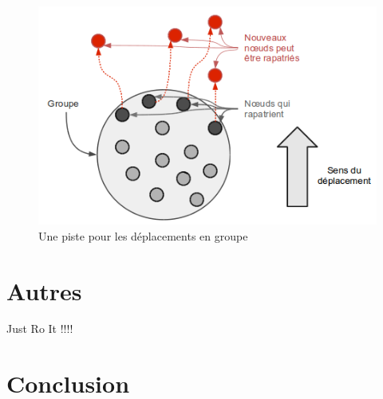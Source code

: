 \documentclass[11pt,a4paper]{article}
\begin{document}
	\vspace{1cm}
        \begin{figure}[!h]
        \centering
        \includegraphics[scale=0.65]{./images/mouvgroup.png}
        \caption{Une piste pour les déplacements en groupe}
        \label{mouvgroup}
        \end{figure}

\newpage
\section{Autres}
Just Ro It !!!!

\section{Conclusion}


\newpage




 
\end{document}

